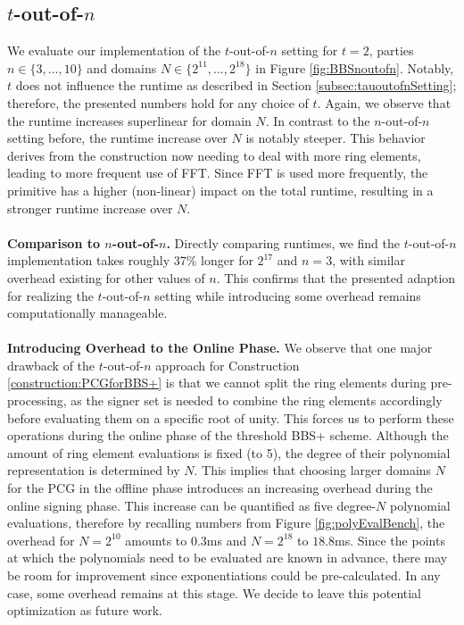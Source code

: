\subsection{$t$-out-of-$n$}
We evaluate our implementation of the $t$-out-of-$n$ setting for $t = 2$, parties $n\in \{3, ..., 10\}$ and domains $N\in \{2^{11}, ...,2^{18}\}$ in Figure \ref{fig:BBSnoutofn}. Notably, $t$ does not influence the runtime as described in Section \ref{subsec:tauoutofnSetting}; therefore, the presented numbers hold for any choice of $t$. Again, we observe that the runtime increases superlinear for domain $N$. In contrast to the $n$-out-of-$n$ setting before, the runtime increase over $N$ is notably steeper. This behavior derives from the construction now needing to deal with more ring elements, leading to more frequent use of FFT. Since FFT is used more frequently, the primitive has a higher (non-linear) impact on the total runtime, resulting in a stronger runtime increase over $N$.
\\\\
\textbf{Comparison to $n$-out-of-$n$.} Directly comparing runtimes, we find the $t$-out-of-$n$ implementation takes roughly 37\% longer for $2^{17}$ and $n=3$, with similar overhead existing for other values of $n$. This confirms that the presented adaption for realizing the $t$-out-of-$n$ setting while introducing some overhead remains computationally manageable.
\\\\
\textbf{Introducing Overhead to the Online Phase.} We observe that one major drawback of the $t$-out-of-$n$ approach for Construction \ref{construction:PCGforBBS+} is that we cannot split the ring elements during pre-processing, as the signer set is needed to combine the ring elements accordingly before evaluating them on a specific root of unity. This forces us to perform these operations during the online phase of the threshold BBS+ scheme. Although the amount of ring element evaluations is fixed (to 5), the degree of their polynomial representation is determined by $N$. This implies that choosing larger domains $N$ for the PCG in the offline phase introduces an increasing overhead during the online signing phase. This increase can be quantified as five degree-$N$ polynomial evaluations, therefore by recalling numbers from Figure \ref{fig:polyEvalBench}, the overhead for $N=2^{10}$ amounts to $0.3$ms and $N=2^{18}$ to $18.8$ms. Since the points at which the polynomials need to be evaluated are known in advance, there may be room for improvement since exponentiations could be pre-calculated. In any case, some overhead remains at this stage. We decide to leave this potential optimization as future work.

